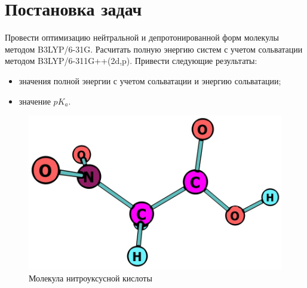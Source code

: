 \section{Постановка задач}
Провести оптимизацию нейтральной и депротонированной форм молекулы методом B3LYP/6-31G. Расчитать полную энергию систем с учетом сольватации методом B3LYP/6-311G++(2d,p). Привести следующие результаты: 
\begin{itemize}
    \item значения полной энергии с учетом сольватации и энергию сольватации;
    \item значение $pK_a$.
\end{itemize}

\begin{figure}[H]
\centering
\captionsetup{justification=centering}
\includegraphics[scale=0.4]{fig/0.jpg}
\caption{Молекула нитроуксусной кислоты}
\end{figure}
